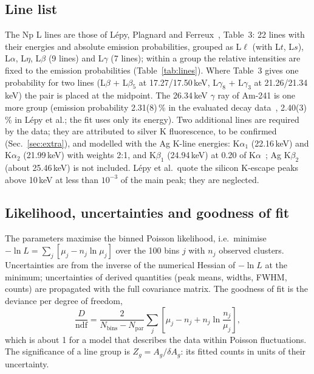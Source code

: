 \documentclass[11pt,a4paper]{article}
\begin{document}
\subsection{Line list}
The Np L lines are those of L\'epy, Plagnard and Ferreux~\cite{lepy2008}, Table~3: 22 lines with their energies and
absolute emission probabilities, grouped as L$\ell$ (with L$t$, L$s$), L$\alpha$, L$\eta$, L$\beta$ (9 lines) and
L$\gamma$ (7 lines); within a group the relative intensities are fixed to the emission probabilities
(Table~\ref{tab:lines}). Where Table~3 gives one probability for two lines (L$\beta$ + L$\beta_5$ at 17.27/17.50\,keV,
L$\gamma_8$ + L$\gamma_3$ at 21.26/21.34\,keV) the pair is placed at the midpoint. The 26.34\,keV $\gamma$ ray of Am-241
is one more group (emission probability 2.31(8)\,\% in the evaluated decay data~\cite{ddep}, 2.40(3)\,\% in
L\'epy et al.; the fit uses only its energy). Two additional lines are required by the data; they are attributed to
silver K fluorescence, to be confirmed (Sec.~\ref{sec:extra}), and modelled with the Ag K-line energies: K$\alpha_1$ (22.16\,keV) and K$\alpha_2$ (21.99\,keV) with weights 2:1, and K$\beta_1$ (24.94\,keV) at
0.20 of K$\alpha$~\cite{xdb}; Ag K$\beta_2$ (about 25.46\,keV) is not included. L\'epy et al.\ quote the silicon K-escape peaks above 10\,keV at less
than $10^{-3}$ of the main peak; they are neglected.

\subsection{Likelihood, uncertainties and goodness of fit}
The parameters maximise the binned Poisson likelihood, i.e.\ minimise
$-\ln L = \sum_j \left[\mu_j - n_j \ln\mu_j\right]$ over the 100 bins $j$ with $n_j$ observed clusters.
Uncertainties are from the inverse of the numerical Hessian of $-\ln L$ at the minimum; uncertainties of derived
quantities (peak means, widths, FWHM, counts) are propagated with the full covariance matrix. The goodness of fit is
the deviance per degree of freedom,
\begin{equation}
\frac{D}{\mathrm{ndf}} = \frac{2}{N_\mathrm{bins}-N_\mathrm{par}}\sum_j\left[\mu_j-n_j+n_j\ln\frac{n_j}{\mu_j}\right],
\end{equation}
which is about 1 for a model that describes the data within Poisson fluctuations. The significance of a line group
is $Z_g = A_g/\delta A_g$: its fitted counts in units of their uncertainty.
\end{document}
